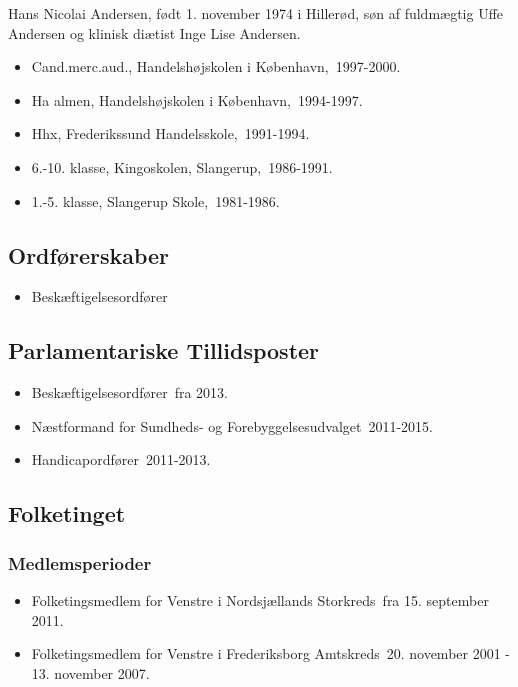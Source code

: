 \documentclass[11pt, a4paper]{awesome-cv}
\begin{document}
\makecvheader[R]
\makelettertitle
\begin{cvletter}
Hans Nicolai Andersen, født 1. november 1974 i Hillerød, søn af fuldmægtig Uffe Andersen og klinisk diætist Inge Lise Andersen.

\begin{itemize}
\item Cand.merc.aud., Handelshøjskolen i København, 1997-2000.
\item Ha almen, Handelshøjskolen i København, 1994-1997.
\item Hhx, Frederikssund Handelsskole, 1991-1994.
\item 6.-10. klasse, Kingoskolen, Slangerup, 1986-1991.
\item 1.-5. klasse, Slangerup Skole, 1981-1986.
\end{itemize}
\subsection*{Ordførerskaber}
\begin{itemize}
\item Beskæftigelsesordfører
\end{itemize}
\subsection*{Parlamentariske Tillidsposter}
\begin{itemize}
\item Beskæftigelsesordfører fra 2013.
\item Næstformand for Sundheds- og Forebyggelsesudvalget 2011-2015.
\item Handicapordfører 2011-2013.
\end{itemize}
\subsection*{Folketinget}
\subsubsection*{Medlemsperioder}
\begin{itemize}
\item Folketingsmedlem for Venstre i Nordsjællands Storkreds fra 15. september 2011.
\item Folketingsmedlem for Venstre i Frederiksborg Amtskreds 20. november 2001 - 13. november 2007.
\end{itemize}

\end{cvletter}
\end{document}
